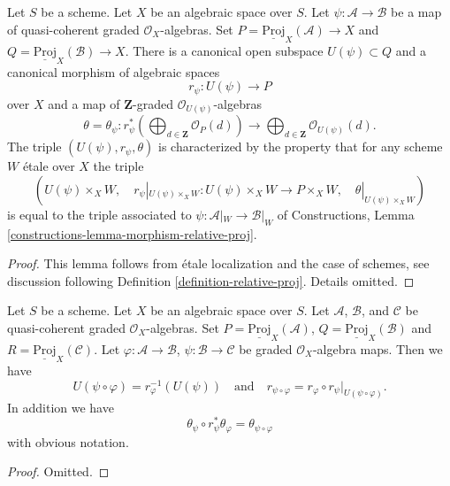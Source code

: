 \begin{lemma}
\label{lemma-morphism-relative-proj}
Let $S$ be a scheme. Let $X$ be an algebraic space over $S$.
Let $\psi : \mathcal{A} \to \mathcal{B}$ be a map of
quasi-coherent graded $\mathcal{O}_X$-algebras. Set
$P = \underline{\text{Proj}}_X(\mathcal{A}) \to X$ and
$Q = \underline{\text{Proj}}_X(\mathcal{B}) \to X$.
There is a canonical open subspace
$U(\psi) \subset Q$ and a canonical morphism of
algebraic spaces
$$
r_\psi :
U(\psi)
\longrightarrow
P
$$
over $X$ and a map of $\mathbf{Z}$-graded $\mathcal{O}_{U(\psi)}$-algebras
$$
\theta = \theta_\psi :
r_\psi^*\left(
\bigoplus\nolimits_{d \in \mathbf{Z}} \mathcal{O}_P(d)
\right)
\longrightarrow
\bigoplus\nolimits_{d \in \mathbf{Z}} \mathcal{O}_{U(\psi)}(d).
$$
The triple $(U(\psi), r_\psi, \theta)$ is characterized by the property
that for any scheme $W$ \'etale over $X$ the triple
$$
(U(\psi) \times_X W,\quad
r_\psi|_{U(\psi) \times_X W} : U(\psi) \times_X W \to  P \times_X W,\quad
\theta|_{U(\psi) \times_X W})
$$
is equal to the triple associated to $\psi : \mathcal{A}|_W \to \mathcal{B}|_W$
of Constructions, Lemma \ref{constructions-lemma-morphism-relative-proj}.
\end{lemma}

\begin{proof}
This lemma follows from \'etale localization and the case of schemes, see
discussion following
Definition \ref{definition-relative-proj}. Details omitted.
\end{proof}

\begin{lemma}
\label{lemma-morphism-relative-proj-transitive}
Let $S$ be a scheme. Let $X$ be an algebraic space over $S$.
Let $\mathcal{A}$, $\mathcal{B}$, and $\mathcal{C}$ be
quasi-coherent graded $\mathcal{O}_X$-algebras.
Set $P = \underline{\text{Proj}}_X(\mathcal{A})$,
$Q = \underline{\text{Proj}}_X(\mathcal{B})$ and
$R = \underline{\text{Proj}}_X(\mathcal{C})$.
Let $\varphi : \mathcal{A} \to \mathcal{B}$,
$\psi : \mathcal{B} \to \mathcal{C}$ be graded $\mathcal{O}_X$-algebra maps.
Then we have
$$
U(\psi \circ \varphi) = r_\varphi^{-1}(U(\psi))
\quad
\text{and}
\quad
r_{\psi \circ \varphi}
=
r_\varphi \circ r_\psi|_{U(\psi \circ \varphi)}.
$$
In addition we have
$$
\theta_\psi \circ r_\psi^*\theta_\varphi
=
\theta_{\psi \circ \varphi}
$$
with obvious notation.
\end{lemma}

\begin{proof}
Omitted.
\end{proof}

